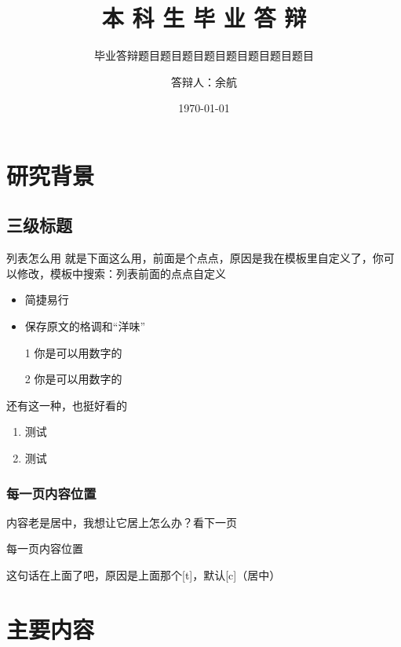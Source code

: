 \documentclass[14pt, AutoFakeBold]{ldr}
\title{本 科 生 毕 业 答 辩}
\subtitle{毕业答辩题目题目题目题目题目题目题目题目}
\author{答辩人：余航}
\institute{指导老师：xx教授}
\date{\today}
\begin{document}
\maketitle


\section{研究背景}
\subsection{三级标题}


\begin{frame}[c]{列表怎么用}
就是下面这么用，前面是个点点，原因是我在模板里自定义了，你可以修改，模板中搜索：列表前面的点点自定义
  \begin{itemize}
  \item 简捷易行
  \item 保存原文的格调和“洋味”
  \item[1] 你是可以用数字的
  \item[2] 你是可以用数字的
  \end{itemize}
还有这一种，也挺好看的
  \begin{enumerate}
    \item 测试
    \item 测试
  \end{enumerate}
\end{frame}




\begin{frame}
  \frametitle{每一页内容位置}

  内容老是居中，我想让它居上怎么办？看下一页


\end{frame}

\begin{frame}[t]{每一页内容位置}

  这句话在上面了吧，原因是上面那个[t]，默认[c]（居中）


\end{frame}



\section{主要内容}
\end{document}

